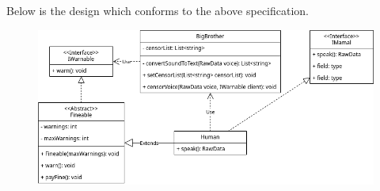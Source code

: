 \documentclass{article}
\begin{document}
Below is the design which conforms to the above specification.

\begin{figure}[ht]
	\includegraphics[width=\textwidth]{hw4q2.png}
\end{figure}
\end{document}
